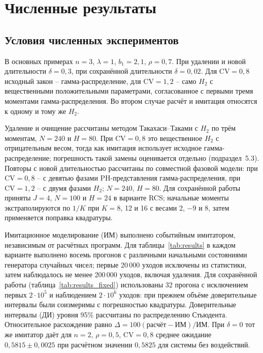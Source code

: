 \section{Численные результаты}\label{sec:results}
\subsection{Условия численных экспериментов}
В основных примерах \(n=3\), \(\lambda=1\), \(b_1=2{,}1\), \(\rho=0{,}7\). При удалении и новой длительности \(\delta=0{,}3\), при сохранённой длительности \(\delta=0{,}02\). Для \(\mathrm{CV}=0{,}8\) исходный закон -- гамма-распределение, для \(\mathrm{CV}=1{,}2\) -- само \(H_2\) с вещественными положительными параметрами, согласованное с первыми тремя моментами гамма-распределения. Во втором случае расчёт и имитация относятся к одному и тому же \(H_2\).

Удаление и очищение рассчитаны методом Такахаси--Таками с \(H_2\) по трём моментам, \(N=240\) и \(H=80\). При \(\mathrm{CV}=0{,}8\) это вещественное \(H_2\) с отрицательным весом, тогда как имитация использует исходное гамма-распределение; погрешность такой замены оценивается отдельно (подраздел~5.3). Повторы с новой длительностью рассчитаны по совместной фазовой модели: при \(\mathrm{CV}=0{,}8\) -- с девятью фазами PH-представления гамма-распределения, при \(\mathrm{CV}=1{,}2\) -- с двумя фазами \(H_2\); \(N=240\), \(H=80\). Для сохранённой работы приняты \(J=4\), \(N=100\) и \(H=24\) в варианте RCS; начальные моменты экстраполируются по \(1/K\) при \(K=8\), 12 и 16 с весами 2, \(-9\) и 8, затем применяется поправка квадратуры.

Имитационное моделирование (ИМ) выполнено событийным имитатором, независимым от расчётных программ. Для таблицы~\ref{tab:results} в каждом варианте выполнено восемь прогонов с различными начальными состояниями генератора случайных чисел; первые 20\,000 уходов исключены из статистики, затем наблюдалось не менее 200\,000 уходов, включая удаления. Для сохранённой работы (таблица~\ref{tab:results_fixed}) использованы 32 прогона с исключением первых \(2\cdot10^5\) и наблюдением \(2\cdot10^6\) уходов: при прежнем объёме доверительные интервалы были соизмеримы с погрешностью квадратуры. Доверительные интервалы (ДИ) уровня 95\% рассчитаны по распределению Стьюдента. Относительное расхождение равно \(\Delta=100(\text{расчёт}-\text{ИМ})/\text{ИМ}\). При \(\delta=0\) тот же имитатор даёт для \(n=2\), \(\rho=0{,}5\), \(\mathrm{CV}=0{,}8\) среднее ожидание \(0{,}5815\pm0{,}0025\) при расчётном значении \(0{,}5825\) для системы без воздействий.

